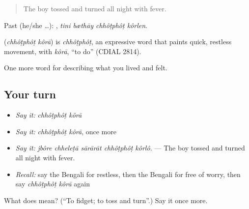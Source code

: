 \begin{quote}
The boy tossed and turned all night with fever.
\end{quote}

Past (he/she …):    , \emph{tini bæthāy chhôṭphôṭ kôrlen}.

\begin{cousinweb}
\textbf{ } (\emph{chhôṭphôṭ kôrā}) is \emph{chhôṭphôṭ}, an expressive word that paints quick, restless movement, with \emph{kôrā}, \textquotedblleft{}to do\textquotedblright{} (CDIAL 2814).
\end{cousinweb}

\begin{grammarlens}[title={What you've built}]
One more word for describing what you lived and felt.
\end{grammarlens}

\subsection*{Your turn}
\begin{itemize}
\raggedright
  \item \emph{Say it:} \emph{chhôṭphôṭ kôrā}
  \item \emph{Say it:} \emph{chhôṭphôṭ kôrā}, once more
  \item \emph{Say it:} \emph{jbôre chheleṭā sārārāt chhôṭphôṭ kôrlô.} — The boy tossed and turned all night with fever.
  \item \emph{Recall:} say the Bengali for restless, then the Bengali for free of worry, then say \emph{chhôṭphôṭ kôrā} again
\end{itemize}

\begin{tcolorbox}[breakable,colback=teal!4,colframe=teal!35!black,title={Before you move on}]
What does   mean? (\textquotedblleft{}To fidget; to toss and turn\textquotedblright{}.) Say it once more.
\end{tcolorbox}
